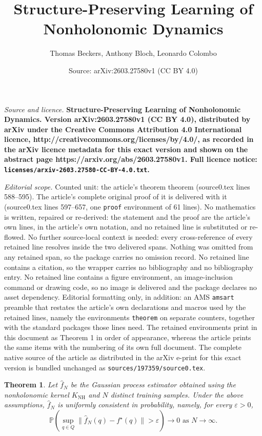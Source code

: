 \documentclass[10pt,a4paper]{amsart}
\title{\bf Structure-Preserving Learning of Nonholonomic Dynamics}
\author{Thomas Beckers, Anthony Bloch, Leonardo Colombo}
\date{Source: arXiv:2603.27580v1 (CC BY 4.0)}
\newtheorem{theorem}{Theorem}
\begin{document}
\maketitle

\noindent\emph{Source and licence.} \bf Structure-Preserving Learning of Nonholonomic Dynamics. Version arXiv:2603.27580v1 (CC BY 4.0), distributed by arXiv under the Creative Commons Attribution 4.0 International licence, http://creativecommons.org/licenses/by/4.0/, as recorded in the arXiv licence metadata for this exact version and shown on the abstract page https://arxiv.org/abs/2603.27580v1. Full licence notice: \texttt{licenses/arxiv-2603.27580-CC-BY-4.0.txt}.\par\smallskip

\noindent\textit{Editorial scope.} Counted unit: the article's theorem theorem (source0.tex lines 588--595). The article's complete original proof of it is delivered with it (source0.tex lines 597--657, one \texttt{proof} environment of 61 lines). No mathematics is written, repaired or re-derived: the statement and the proof are the article's own lines, in the article's own notation, and no retained line is substituted or re-flowed.  No further source-local context is needed: every cross-reference of every retained line resolves inside the two delivered spans.  Nothing was omitted from any retained span, so the package carries no omission record.  No retained line contains a citation, so the wrapper carries no bibliography and no bibliography entry.  No retained line contains a figure environment, an image-inclusion command or drawing code, so no image is delivered and the package declares no asset dependency.  Editorial formatting only, in addition: an AMS \texttt{amsart} preamble that restates the article's own declarations and macros used by the retained lines, namely the environments \texttt{theorem} on separate counters, together with the standard packages those lines need.  The retained environments print in this document as Theorem 1 in order of appearance, whereas the article prints the same items with the numbering of its own full document.  The complete native source of the article as distributed in the arXiv e-print for this exact version is bundled unchanged as \texttt{sources/197359/source0.tex}.
\begin{theorem}
Let $\hat f_N$ be the Gaussian process estimator obtained using the nonholonomic kernel $K_{\mathrm{NH}}$ and $N$ distinct training samples. Under the above assumptions, $\hat f_N$ is uniformly consistent in probability, namely, for every $\varepsilon>0$,
\[
\mathbb{P}\!\left(
\sup_{q\in Q}\|\hat f_N(q)-f^\star(q)\|>\varepsilon
\right)\to 0\,\, \text{as } N\to\infty.
\]
\end{theorem}
\end{document}
